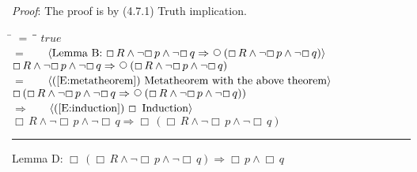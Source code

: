 \documentclass[12pt, fleqn, leqno]{article}
\newcommand{\lgap}{2pt}                             %
\newcommand{\mymathindent}{24pt}                    %
\newcommand{\impl}{\ensuremath{\Rightarrow}}        %
\newcommand{\Next}{\;\,\text{\raisebox{3.5pt}{\circle{6}}}}
\newcommand{\Always}{\Box\,}
\newcommand{\myqed}{\rule[-.23ex]{1.2ex}{2.0ex}}
\newcommand{\myqedtab}{\hspace{384pt}}              %
\newcommand{\Gll} {\langle}                         %
\newcommand{\Ggg} {\rangle}                         %
\newcommand{\Hint}[1]     {\ \ \ $\Gll              \mbox{#1} \Ggg$ }   %
\begin{document}
\emph{Proof}: The proof is by (4.7.1) Truth implication.
\begin{tabbing}
\hspace{\mymathindent} \= $= \;$ \= \myqedtab \= \kill
\> \>   $true$\\[\lgap]
 \> $=$  \>  \Hint{Lemma B: $\Always R \land \neg \Always p \land \neg \Always q \impl \Next (\Always R \land \neg \Always p \land \neg \Always q )$}\\[\lgap]
  \> \>   $\Always R \land \neg \Always p \land \neg \Always q \impl \Next (\Always R \land \neg \Always p \land \neg \Always q )$\\[\lgap]
 \> $=$  \>  \Hint{(\ref{E:metatheorem}) Metatheorem with the above theorem}\\[\lgap]
   \> \>   $\Always (\Always R \land \neg \Always p \land \neg \Always q  \impl \Next (\Always R \land \neg \Always p \land \neg \Always q ))$\\[\lgap]
 \> $\impl$  \>  \Hint{(\ref{E:induction}) $\Always$ Induction}\\[\lgap]
 \> \>   $\Always R \land \neg \Always p \land \neg \Always q  \impl \Always (\Always R \land \neg \Always p \land \neg \Always q )$ \quad \myqed
\end{tabbing}
Lemma D: $\Always (\Always R \land \neg \Always p \land \neg \Always q) \impl \Always p \land \Always q$
\end{document}
